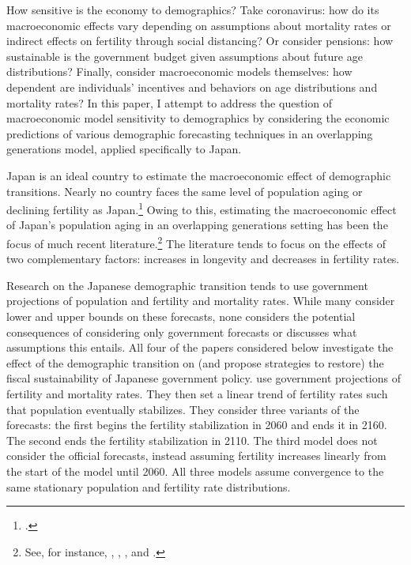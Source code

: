 \documentclass[10pt]{article}
\numberwithin{equation}{subsection}
\begin{document}
\par How sensitive is the economy to demographics? Take coronavirus: how do its macroeconomic effects vary depending on assumptions about mortality rates or indirect effects on fertility through social distancing? Or consider pensions: how sustainable is the government budget given assumptions about future age distributions? Finally, consider macroeconomic models themselves: how dependent are individuals' incentives and behaviors on age distributions and mortality rates? In this paper, I attempt to address the question of macroeconomic model sensitivity to demographics by considering the economic predictions of various demographic forecasting techniques in an overlapping generations model, applied specifically to Japan.

\par Japan is an ideal country to estimate the macroeconomic effect of demographic transitions. Nearly no country faces the same level of population aging or declining fertility as Japan.\footnote{\cite{MOS2016}.} Owing to this, estimating the macroeconomic effect of Japan's population aging in an overlapping generations setting has been the focus of much recent literature.\footnote{See, for instance, \cite{BJ2015}, \cite{IKY2016}, \cite{K2015}, and \cite{MOS2016}.} The literature tends to focus on the effects of two complementary factors: increases in longevity and decreases in fertility rates.

\par Research on the Japanese demographic transition tends to use government projections of population and fertility and mortality rates. While many consider lower and upper bounds on these forecasts, none considers the potential consequences of considering only government forecasts or discusses what assumptions this entails. All four of the papers considered below investigate the effect of the demographic transition on (and propose strategies to restore) the fiscal sustainability of Japanese government policy. \cite{BJ2015} use government projections of fertility and mortality rates. They then set a linear trend of fertility rates such that population eventually stabilizes. They consider three variants of the forecasts: the first begins the fertility stabilization in 2060 and ends it in 2160. The second ends the fertility stabilization in 2110. The third model does not consider the official forecasts, instead assuming fertility increases linearly from the start of the model until 2060. All three models assume convergence to the same stationary population and fertility rate distributions.
\end{document}
